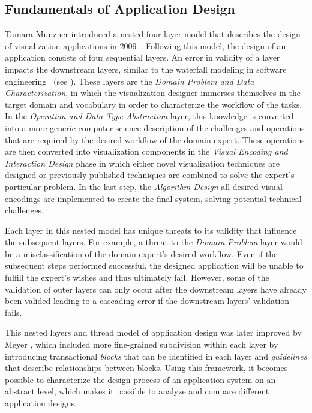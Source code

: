 \subsection{Fundamentals of Application Design} \label{cha:intro:appl:design}
Tamara Munzner introduced a nested four-layer model that describes the design of visualization applications in 2009~\cite{munzner2009nested}.  Following this model, the design of an application consists of four sequential layers.  An error in validity of a layer impacts the downstream layers, similar to the waterfall modeling in software engineering~\cite{royce1987managing} (see ).  These layers are the \emph{Domain Problem and Data Characterization}, in which the visualization designer immerses themselves in the target domain and vocabulary in order to characterize the workflow of the tasks.  In the \emph{Operation and Data Type Abstraction} layer, this knowledge is converted into a more generic computer science description of the challenges and operations that are required by the desired workflow of the domain expert.  These operations are then converted into visualization components in the \emph{Visual Encoding and Interaction Design} phase in which either novel visualization techniques are designed or previously published techniques are combined to solve the expert's particular problem.  In the last step, the \emph{Algorithm Design} all desired visual encodings are implemented to create the final system, solving potential technical challenges.

Each layer in this nested model has unique threats to its validity that influence the subsequent layers.  For example, a threat to the \emph{Domain Problem} layer would be a misclassification of the domain expert's desired workflow.  Even if the subsequent steps performed successful, the designed application will be unable to fulfill the expert's wishes and thus ultimately fail.  However, some of the validation of outer layers can only occur after the downstream layers have already been valided leading to a cascading error if the downstream layers' validation fails.

This nested layers and thread model of application design was later improved by Meyer \etal , which included more fine-grained subdivision within each layer by introducing transactional \emph{blocks} that can be identified in each layer and \emph{guidelines} that describe relationships between blocks.  Using this framework, it becomes possible to characterize the design process of an application system on an abstract level, which makes it possible to analyze and compare different application designs.



